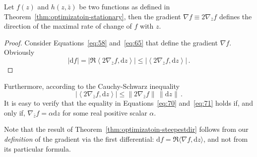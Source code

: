 \begin{thm}
  \label{thm:optimizatoin-steepestdir}
  Let $f(z)$ and $h(z, \bar z)$ be two functions as defined in
  Theorem~\ref{thm:optimizatoin-stationary}, then the gradient $\nabla
  f \equiv 2\nabla_{\bar z}f$ defines the direction of the maximal
  rate of change of $f$ with $z$.
\end{thm}
\begin{proof}[Proof]
  Consider Equations~\eqref{eq:58} and~\eqref{eq:65} that define the
  gradient $\nabla f$. Obviously
  \begin{equation}
    \label{eq:70}
    |\mathrm{d} f| =
    \left|
      \Re
      \left\langle
        2\nabla_{\bar z}f, \mathrm{d} z
      \right\rangle
    \right|
    \leq
    \left|
      \left\langle
        2\nabla_{\bar z}f, \mathrm{d} z
      \right\rangle
    \right| \,. 
  \end{equation}
\end{proof}
Furthermore, according to the Cauchy-Schwarz inequality
\begin{equation}
  \label{eq:71}
  \left|
      \left\langle
        2\nabla_{\bar z}f, \mathrm{d} z
      \right\rangle
    \right|
    \leq
    \| 2\nabla_{\bar z}f \|\, \| \mathrm{d} z \| \,.
\end{equation}
It is easy to verify that the equality in Equations~\eqref{eq:70}
and~\eqref{eq:71} holds if, and only if, $\nabla_{\bar z}f=\alpha
\mathrm{d} z$ for some real positive scalar $\alpha$.

Note that the result of Theorem~\ref{thm:optimizatoin-steepestdir}
follows from our \textit{definition} of the gradient via the first
differential: $\mathrm{d}f = \Re \langle \nabla f, \mathrm{d}z
\rangle$, and not from its particular formula.

